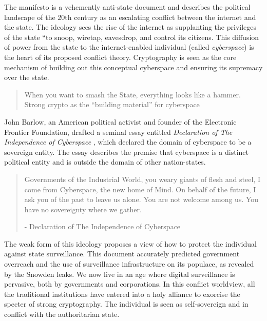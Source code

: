 The manifesto is a vehemently anti-state document and describes the political
landscape of the 20th century as an escalating conflict between the internet and
the state. The ideology sees the rise of the internet as supplanting the
privileges of the state ``to snoop, wiretap, eavesdrop, and control its
citizens.  This diffusion of power from the state to the internet-enabled
individual (called \textit{cyberspace}) is the heart of its proposed conflict
theory. Cryptography is seen as the core mechanism of building out this
conceptual cyberspace and ensuring its supremacy over the state.

\begin{quote}
When you want to smash the State, everything looks like a hammer.
Strong crypto as the ``building material'' for cyberspace
\end{quote}

John Barlow, an American political activist and founder of the Electronic
Frontier Foundation, drafted a seminal essay entitled \textit{Declaration of The
Independence of Cyberspace} \cite{barlow_declaration_2019}, which declared the
domain of cyberspace to be a sovereign entity. The essay describes the premise
that cyberspace is a distinct political entity and is outside the domain of
other nation-states.

\begin{quote}
Governments of the Industrial World, you weary giants of flesh and steel, I come
from Cyberspace, the new home of Mind. On behalf of the future, I ask you of
 the past to leave us alone. You are not welcome among us. You have no
sovereignty where we gather.
\begin{flushright}
- Declaration of The Independence of Cyberspace
\end{flushright}
\end{quote}

The weak form of this ideology proposes a view of how to protect the individual
against state surveillance. This document accurately predicted government
overreach and the use of surveillance infrastructure on its populace, as
revealed by the Snowden leaks. We now live in an age where digital surveillance
is pervasive, both by governments and corporations. In this conflict worldview,
all the traditional institutions have entered into a holy alliance to exorcise
the specter of strong cryptography. The individual is seen as self-sovereign and
in conflict with the authoritarian state.


